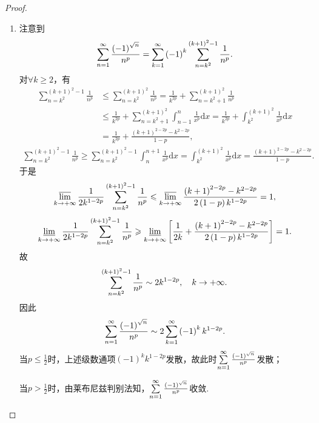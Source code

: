 \documentclass[../../main.tex]{subfiles}%
\begin{document}
\begin{proof}
\begin{enumerate}[(1)]
\item 注意到
\begin{align*}
\sum_{n=1}^{\infty}\limits\frac{\left( -1 \right) ^{\sqrt{n}}}{n^p}=\sum_{k=1}^{\infty}\limits\left( -1 \right) ^k\sum_{n=k^2}^{\left( k+1 \right) ^2-1}\limits\frac{1}{n^p}.
\end{align*}
对$\forall k\geqslant 2$，有
\begin{align*}
\sum_{n=k^2}^{\left( k+1 \right) ^2-1}{\frac{1}{n^p}}&\leqslant \sum_{n=k^2}^{\left( k+1 \right) ^2}{\frac{1}{n^p}}=\frac{1}{k^{2p}}+\sum_{n=k^2+1}^{\left( k+1 \right) ^2}{\frac{1}{n^p}}
\\
&\leqslant \frac{1}{k^{2p}}+\sum_{n=k^2+1}^{\left( k+1 \right) ^2}{\int_{n-1}^n{\frac{1}{x^p}\mathrm{d}x}}=\frac{1}{k^{2p}}+\int_{k^2}^{\left( k+1 \right) ^2}{\frac{1}{x^p}\mathrm{d}x}
\\
&=\frac{1}{k^{2p}}+\frac{\left( k+1 \right) ^{2-2p}-k^{2-2p}}{1-p},
\end{align*}
\begin{align*}
\sum_{n=k^2}^{\left( k+1 \right) ^2-1}{\frac{1}{n^p}}\geqslant \sum_{n=k^2}^{\left( k+1 \right) ^2-1}{\int_n^{n+1}{\frac{1}{x^p}\mathrm{d}x}}=\int_{k^2}^{\left( k+1 \right) ^2}{\frac{1}{x^p}\mathrm{d}x}=\frac{\left( k+1 \right) ^{2-2p}-k^{2-2p}}{1-p}.
\end{align*}
于是
\begin{align*}
\varlimsup_{k\rightarrow +\infty}\limits\frac{1}{2k^{1-2p}}\sum_{n=k^2}^{\left( k+1 \right) ^2-1}\limits\frac{1}{n^p}\leqslant \varlimsup_{k\rightarrow +\infty}\limits\frac{\left( k+1 \right) ^{2-2p}-k^{2-2p}}{2\left( 1-p \right) k^{1-2p}}=1,
\end{align*}
\begin{align*}
\varliminf_{k\rightarrow +\infty}\limits\frac{1}{2k^{1-2p}}\sum_{n=k^2}^{\left( k+1 \right) ^2-1}\limits\frac{1}{n^p}\geqslant \varliminf_{k\rightarrow +\infty}\limits\left[ \frac{1}{2k}+\frac{\left( k+1 \right) ^{2-2p}-k^{2-2p}}{2\left( 1-p \right) k^{1-2p}} \right] =1.
\end{align*}
故
\begin{align*}
\sum_{n=k^2}^{\left( k+1 \right) ^2-1}\limits\frac{1}{n^p}\sim 2k^{1-2p},\quad k\rightarrow +\infty.
\end{align*}
因此
\begin{align*}
\sum_{n=1}^{\infty}\limits\frac{\left( -1 \right) ^{\sqrt{n}}}{n^p}\sim 2\sum_{k=1}^{\infty}\limits\left( -1 \right) ^kk^{1-2p}.
\end{align*}
当$p\leqslant \frac{1}{2}$时，上述级数通项$\left( -1 \right) ^kk^{1-2p}$发散，故此时$\sum_{n=1}^{\infty}\limits\frac{\left( -1 \right) ^{\sqrt{n}}}{n^p}$发散；

当$p>\frac{1}{2}$时，由莱布尼兹判别法知，$\sum_{n=1}^{\infty}\limits\frac{\left( -1 \right) ^{\sqrt{n}}}{n^p}$收敛.
\end{enumerate}

\end{proof}
\end{document}
